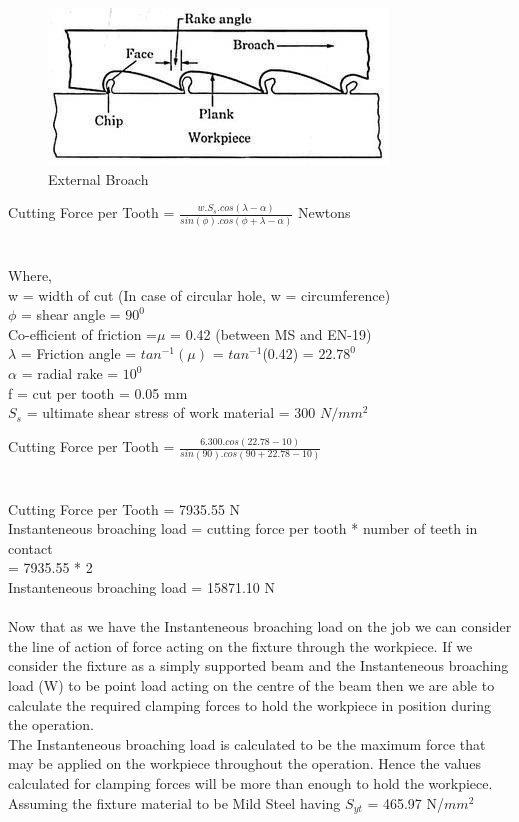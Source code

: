 \documentclass[16pt,a4paper]{article}
\begin{document}
\begin{figure}[h]
\centering
\includegraphics[scale=0.7]{External Broach}
\caption{External Broach}
\label{fig:External Broach}
\end{figure}

Cutting Force per Tooth = $\frac {w.S_s.cos(\lambda - \alpha)}{sin(\phi).cos(\phi + \lambda -\alpha)}$ Newtons \\  \\          
\\Where,
\\w = width of cut (In case of circular hole, w = circumference)
\\$\phi$ = shear angle = $90^0$
\\Co-efficient of friction =$\mu$ = 0.42 (between MS and EN-19)
\\$\lambda$ = Friction angle = $tan^{-1}(\mu)$ = $tan^{-1}$(0.42) = $22.78^0$
\\$\alpha$ = radial rake = $10^0$
\\f = cut per tooth = 0.05 mm
\\$S_s$ = ultimate shear stress of work material = 300 $N/mm^2$

Cutting Force per Tooth = $\frac {6 . 300 . cos (22.78 - 10)}{sin (90) . cos (90 + 22.78 - 10)}$ \\    \\    
\\Cutting Force per Tooth = 7935.55 N
\\Instanteneous broaching load = cutting force per tooth * number of teeth in contact 
\\                                                 = 7935.55 * 2 
\\Instanteneous broaching load =  15871.10 N   \\        
\\Now that as we have the Instanteneous broaching load on the job we can consider the line of action of force acting on the fixture through the workpiece. If we consider the fixture as a simply supported beam and the Instanteneous broaching load (W) to be point load acting on the centre of the beam then we are able to calculate the required clamping forces to hold the workpiece in position during the operation. 
\\The Instanteneous broaching load is calculated to be the maximum force that may be applied on the workpiece throughout the operation. Hence the values calculated for clamping forces will be more than enough to hold the workpiece. Assuming the fixture material to be Mild Steel having $S_{yt}$ = 465.97 N/$mm^2$
\end{document}
